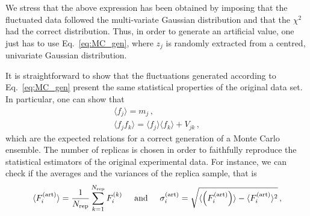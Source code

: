 We stress that the above expression has been obtained by imposing that the fluctuated data followed the multi-variate Gaussian distribution and that the $\chi^2$ had the correct distribution. Thus, in order to generate an artificial value, one just has to use Eq.~\eqref{eq:MC_gen}, where $z_j$ is randomly extracted from a centred, univariate Gaussian distribution.\par
It is straightforward to show that the fluctuations generated according to Eq.~\eqref{eq:MC_gen} present the same statistical properties of the original data set. In particular, one can show that
\begin{gather}
  \langle f_j \rangle = m_j \,,\\
  \langle f_j f_k \rangle = \langle f_j \rangle \langle f_k \rangle + V_{jk} \,,
\end{gather}
which are the expected relations for a correct generation of a Monte Carlo ensemble.
%
%
The number of replicas is chosen in order to faithfully reproduce the statistical estimators of the original experimental data. For instance, we can check if the averages and the variances of the replica sample, that is
\begin{equation}
  \langle F_{i}^{\textrm{(art)}} \rangle = \frac{1}{N_{\textrm{rep}}} \sum_{k=1}^{N_{\textrm{rep}}} F_{i}^{(k)} \hspace{5mm} \textrm{and} \hspace*{5mm} \sigma_i^{\textrm{(art)}} = \sqrt{ \langle \left( F_{i}^{\textrm{(art)}} \right) \rangle - \langle F_{i}^{\textrm{(art)}} \rangle^2} \,,
\end{equation}
